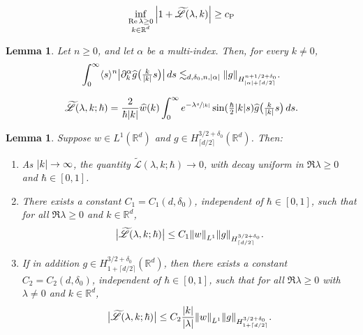 \documentclass[10pt,a4paper]{article}
\newenvironment{enumeratea}
{\bgroup\def\theenumi{\alph{enumi}}\begin{enumerate}}
{\end{enumerate}\egroup}
\newcommand{\babs}[1]{\bigl|#1\bigr|}
\theoremstyle{plain}
\newtheorem{lemma}[theorem]{Lemma}
\theoremstyle{remark}
\newcommand{\bbr}[1]{\bigl(#1 \bigr)}
\newcommand{\ak}{\abs{k}}
\newcommand{\aal}{\abs{\alpha}}
\newcommand{\p}{\partial}
\newcommand{\jb}[1]{\langle#1\rangle}
\newcommand{\mytextfrac}[2]{{\textstyle\frac{#1}{#2}}}
\newcommand{\R}{\mathbb{R}}
\newcommand{\lam}{\lambda}
\newcommand{\ceils}[1]{\lceil#1\rceil}
\begin{document}
\begin{align}\label{Penrose}
\inf_{\substack{\Re\lambda \geq 0 \\ k \in \R^d}} \abs{1 + \widetilde{\mathscr{L}}(\lambda, k)} \geq {c_{\mathrm{P}}}
\end{align}

\begin{lemma}\label{gnorm}
Let \( n \geq 0 \), and let \( \alpha \) be a multi-index. Then, for every $k\neq0$,
\begin{align*}
\int_0^\infty\jb{s}^{n}\babs{\p^\alpha_k\widehat g\bbr{\mytextfrac{k}{\abs{k}}s}}\,ds\lesssim_{d,
\delta_0,n,\aal}\norm{g}_{H^{n+{{1/2}}+\delta_0}_{\aal+\ceils{d/2}}}.\end{align*}
\end{lemma}

\begin{align}
\widetilde {\mathscr L}(\lam,k;\hbar)
= \frac{2}{\hbar\ak} \widehat w(k) \int_0^\infty e^{-\lam \sfrac{s}{\ak}} \sin(\mytextfrac{\hbar}{2} \ak s) \widehat g\bbr{\mytextfrac{k}{\ak}s} \, ds. \label{Lingoodcoordinates}
\end{align}

\begin{lemma}\label{boundedness and decay lemma}
Suppose $w\in L^1(\R^d)$ and $g\in H^{3/2+\delta_0}_{\ceils{d/2}}(\R^d)$. Then:\vspace*{-3pt}
\begin{enumeratea}
\item \label{(a)} As $\ak\to\infty$, the quantity $\widetilde {\mathscr L}(\lam,k;\hbar)\to0$, with decay uniform in $\Re\lam\geq0$ and $\hbar\in[0,1]$.

\item \label{(b)}There exists a constant $C_1=C_1(d,\delta_0)$, independent of $\hbar\in [0,1]$, such that for all $\Re\lam\geq0$ and $k\in\R^d$,\vspace*{-3pt}
\begin{align*}
\babs{\widetilde {\mathscr L}(\lam,k;\hbar)}\leq C_1\norm{w}_{L^1}\norm{g}_{H^{3/2+\delta_0}_{\ceils{d/2}}}.
\end{align*}
\item \label{(c)} If in addition $g\in H^{3/2+\delta_0}_{1+\ceils{d/2}}(\R^d)$, then there exists a constant $C_2=C_2(d,\delta_0)$, independent of $\hbar\in [0,1]$, such that for all $\Re\lam\geq0$ with $\lam\neq0$ and $k\in\R^d$,\vspace*{-3pt}
\begin{align*}
\babs{\widetilde {\mathscr L}(\lam,k;\hbar)}\leq C_2\frac{\ak}{\abs{\lam}}\norm{w}_{L^1}\norm{g}_{H^{3/2+\delta_0}_{1+\ceils{d/2}}}.
\end{align*}
\end{enumeratea}
\end{lemma}
\end{document}

